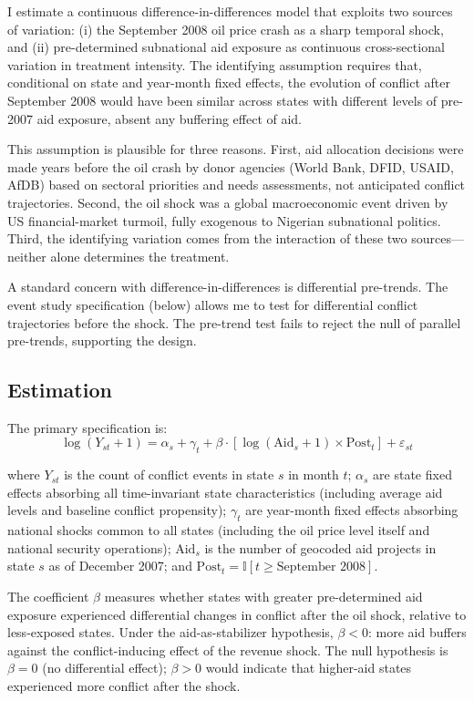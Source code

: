 \documentclass[12pt]{article}
\newcommand{\ind}{\mathbb{I}}
\begin{document}
I estimate a continuous difference-in-differences model that exploits two sources of variation: (i) the September 2008 oil price crash as a sharp temporal shock, and (ii) pre-determined subnational aid exposure as continuous cross-sectional variation in treatment intensity. The identifying assumption requires that, conditional on state and year-month fixed effects, the evolution of conflict after September 2008 would have been similar across states with different levels of pre-2007 aid exposure, absent any buffering effect of aid.

This assumption is plausible for three reasons. First, aid allocation decisions were made years before the oil crash by donor agencies (World Bank, DFID, USAID, AfDB) based on sectoral priorities and needs assessments, not anticipated conflict trajectories. Second, the oil shock was a global macroeconomic event driven by US financial-market turmoil, fully exogenous to Nigerian subnational politics. Third, the identifying variation comes from the interaction of these two sources---neither alone determines the treatment.

A standard concern with difference-in-differences is differential pre-trends. The event study specification (below) allows me to test for differential conflict trajectories before the shock. The pre-trend test fails to reject the null of parallel pre-trends, supporting the design.

\subsection{Estimation}

The primary specification is:
\begin{equation}
\log(Y_{st} + 1) = \alpha_s + \gamma_t + \beta \cdot [\log(\text{Aid}_s + 1) \times \text{Post}_t] + \varepsilon_{st}
\label{eq:main}
\end{equation}

\noindent where $Y_{st}$ is the count of conflict events in state $s$ in month $t$; $\alpha_s$ are state fixed effects absorbing all time-invariant state characteristics (including average aid levels and baseline conflict propensity); $\gamma_t$ are year-month fixed effects absorbing national shocks common to all states (including the oil price level itself and national security operations); $\text{Aid}_s$ is the number of geocoded aid projects in state $s$ as of December 2007; and $\text{Post}_t = \ind[t \geq \text{September 2008}]$.

The coefficient $\beta$ measures whether states with greater pre-determined aid exposure experienced differential changes in conflict after the oil shock, relative to less-exposed states. Under the aid-as-stabilizer hypothesis, $\beta < 0$: more aid buffers against the conflict-inducing effect of the revenue shock. The null hypothesis is $\beta = 0$ (no differential effect); $\beta > 0$ would indicate that higher-aid states experienced more conflict after the shock.
\end{document}
